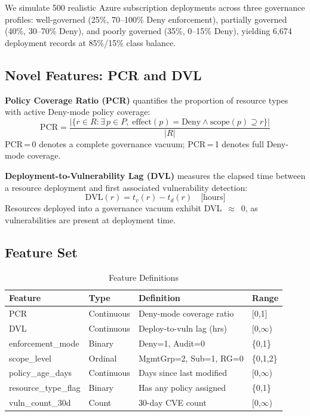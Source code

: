 \documentclass[conference]{IEEEtran}
\begin{document}
We simulate 500 realistic Azure subscription deployments across three 
governance profiles: well-governed (25\%, 70--100\% Deny enforcement), 
partially governed (40\%, 30--70\% Deny), and poorly governed (35\%, 
0--15\% Deny), yielding 6,674 deployment records at 85\%/15\% 
class balance.

\subsection{Novel Features: PCR and DVL}

\textbf{Policy Coverage Ratio (PCR)} quantifies the proportion of 
resource types with active Deny-mode policy coverage:
\begin{equation}
  \text{PCR} = \frac{|\{r \in R : \exists\, p \in P,\; 
  \text{effect}(p)=\text{Deny} \wedge \text{scope}(p) \supseteq r\}|}{|R|}
\end{equation}
PCR\,=\,0 denotes a complete governance vacuum; PCR\,=\,1 denotes 
full Deny-mode coverage.

\textbf{Deployment-to-Vulnerability Lag (DVL)} measures the elapsed 
time between a resource deployment and first associated vulnerability 
detection:
\begin{equation}
  \text{DVL}(r) = t_v(r) - t_d(r) \quad \text{[hours]}
\end{equation}
Resources deployed into a governance vacuum exhibit DVL~$\approx$~0, 
as vulnerabilities are present at deployment time.

\subsection{Feature Set}

\begin{table}[htbp]
\caption{Feature Definitions}
\label{tab:features}
\centering
\small
\begin{tabular}{llll}
\toprule
\textbf{Feature} & \textbf{Type} & \textbf{Definition} & \textbf{Range} \\
\midrule
PCR & Continuous & Deny-mode coverage ratio & [0,1] \\
DVL & Continuous & Deploy-to-vuln lag (hrs) & [0,$\infty$) \\
enforcement\_mode & Binary & Deny=1, Audit=0 & \{0,1\} \\
scope\_level & Ordinal & MgmtGrp=2, Sub=1, RG=0 & \{0,1,2\} \\
policy\_age\_days & Continuous & Days since last modified & [0,$\infty$) \\
resource\_type\_flag & Binary & Has any policy assigned & \{0,1\} \\
vuln\_count\_30d & Count & 30-day CVE count & [0,$\infty$) \\
\bottomrule
\end{tabular}
\end{table}
\end{document}
